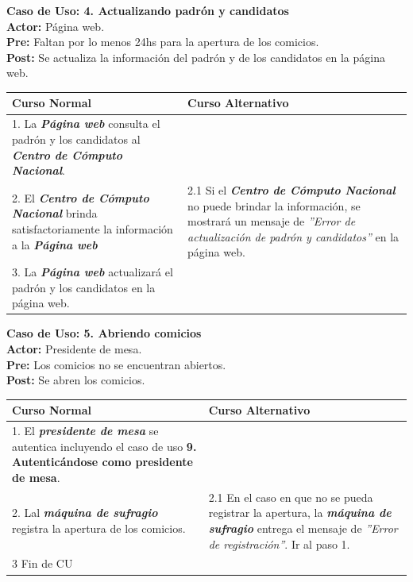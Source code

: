 \documentclass[spanish, 10pt,a4paper]{article}
\numberwithin{equation}{section} %
\begin{document}
\noindent\textbf{Caso de Uso: 4. Actualizando padrón y candidatos}\\
\textbf{Actor: } Página web.\\
\textbf{Pre: } Faltan por lo menos 24hs para la apertura de los comicios.\\
\textbf{Post: } Se actualiza la información del padrón y de los candidatos en la página web.\\
\begin{table}[H]
  \centering
  \begin{tabular}{p{9cm} | p{7cm}}
    \hline
    Curso Normal & Curso Alternativo \\
    \hline
    \hline    
    1. La \textbf{\textit{Página web}} consulta el padrón y los candidatos al \textbf{\textit{Centro de Cómputo Nacional}}. 
    & \\
    
    \hline
    2. El \textbf{\textit{Centro de Cómputo Nacional}} brinda satisfactoriamente la información a la \textbf{\textit{Página web}}
    & 
    2.1 Si el \textbf{\textit{Centro de Cómputo Nacional}} no puede brindar la información, se mostrará un mensaje de \textit{''Error de actualización de padrón y candidatos''} en la página web.
    \\
    
    \hline
    3. La \textbf{\textit{Página web}} actualizará el padrón y los candidatos en la página web.
    & \\
    \hline
  \end{tabular}
\end{table}


\newpage
\noindent\textbf{Caso de Uso: 5. Abriendo comicios}\\
\textbf{Actor: } Presidente de mesa.\\
\textbf{Pre: } Los comicios no se encuentran abiertos.\\
\textbf{Post: } Se abren los comicios.\\
\begin{table}[H]
  \centering
\bgroup
\def\arraystretch{1.3}
  \begin{tabular}{p{9cm} | p{7cm}}
    \hline
    Curso Normal & Curso Alternativo \\
    \hline
    \hline    
        1. El \textbf{\textit{presidente de mesa}} se autentica incluyendo el caso de uso \textbf{ 9. Autenticándose como presidente de mesa}. \\
    \hline
    2. Lal \textbf{\textit{máquina de sufragio}} registra la apertura de los comicios.
    &
    2.1 En el caso en que no se pueda registrar la apertura, la \textbf{\textit{máquina de sufragio}} entrega el mensaje de \textit{''Error de registración''}. Ir al paso 1.
    \\
    
    \hline
    3 Fin de CU
    & \\
    \hline
  \end{tabular}
\egroup
\end{table}
\end{document}
